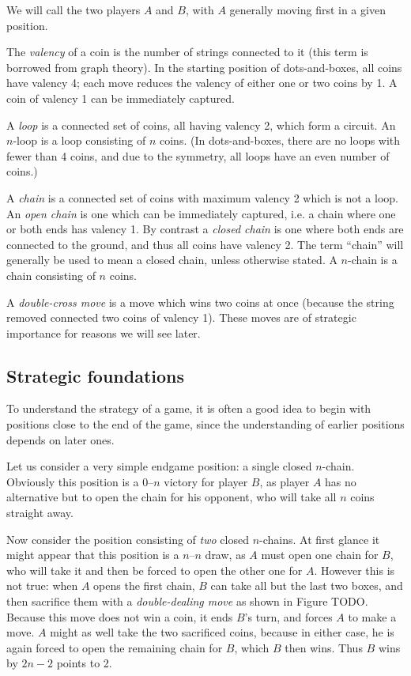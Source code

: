 \documentclass[a4paper,twocolumn]{article}
\begin{document}
We will call the two players $A$ and $B$, with $A$ generally moving
first in a given position.

The \emph{valency} of a coin is the number of strings connected to it
(this term is borrowed from graph theory). In the starting position of
dots-and-boxes, all coins have valency 4; each move reduces the
valency of either one or two coins by 1. A coin of valency 1 can
be immediately captured.

A \emph{loop} is a connected set of coins, all having valency 2, which
form a circuit. An $n$-loop is a loop consisting of $n$ coins. (In
dots-and-boxes, there are no loops with fewer than 4 coins, and due to
the symmetry, all loops have an even number of coins.)

A \emph{chain} is a connected set of coins with maximum valency 2
which is not a loop. An \emph{open chain} is one which can be
immediately captured, i.e. a chain where one or both ends has valency
1. By contrast a \emph{closed chain} is one where both ends are
connected to the ground, and thus all coins have valency 2. The term
``chain'' will generally be used to mean a closed chain, unless
otherwise stated. A $n$-chain is a chain consisting of $n$ coins.

A \emph{double-cross move} is a move which wins two coins at once
(because the string removed connected two coins of valency 1). These
moves are of strategic importance for reasons we will see later.

\subsection{Strategic foundations}

To understand the strategy of a game, it is often a good idea to begin
with positions close to the end of the game, since the understanding
of earlier positions depends on later ones.

Let us consider a very simple endgame position: a single closed
$n$-chain. Obviously this position is a 0--$n$ victory for player $B$,
as player $A$ has no alternative but to open the chain for his
opponent, who will take all $n$ coins straight away.

Now consider the position consisting of \emph{two} closed
$n$-chains. At first glance it might appear that this position is a
$n$--$n$ draw, as $A$ must open one chain for $B$, who will take it
and then be forced to open the other one for $A$. However this is not
true: when $A$ opens the first chain, $B$ can take all but the last
two boxes, and then sacrifice them with a \emph{double-dealing move}
as shown in Figure TODO. Because this move does not win a coin, it
ends $B$'s turn, and forces $A$ to make a move. $A$ might as well take
the two sacrificed coins, because in either case, he is again forced
to open the remaining chain for $B$, which $B$ then wins. Thus $B$
wins by $2n - 2$ points to 2.
\end{document}
